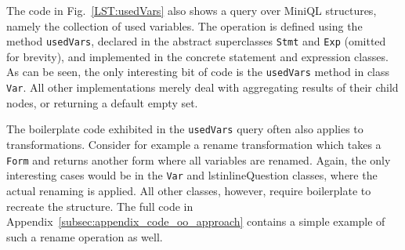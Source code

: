
The code in Fig.~\ref{LST:usedVars} also shows a query over MiniQL structures, namely the collection of used variables.
The operation is defined using the method \lstinline{usedVars}, declared in the abstract superclasses  \lstinline{Stmt} and \lstinline{Exp} (omitted for brevity), and implemented in the concrete statement and expression classes.
As can be seen, the only interesting bit of code is the \lstinline{usedVars} method in class \lstinline{Var}.
All other implementations merely deal with aggregating results of their child nodes, or returning a default empty set.

The boilerplate code exhibited in the \lstinline{usedVars} query often
also applies to transformations.  Consider for example a rename
transformation which takes a \lstinline{Form} and returns another form
where all variables are renamed.  Again, the only interesting cases would be 
in the \lstinline{Var} and lstinline{Question} classes, where the actual renaming is
applied. All other classes, however, require boilerplate to recreate
the structure. The full code in
Appendix~\ref{subsec:appendix_code_oo_approach} contains a simple
example of such a rename operation as well.


\begin{figure*}[t]
  \nocaptionrule
  \begin{minipage}[t]{0.48\textwidth}
  \end{minipage}
  \vline
  \hspace*{2pt}
  \begin{minipage}[t]{0.48\textwidth}
  \end{minipage}

    \caption{Implementing the ``used variables'' operation using traditional ASTs (left) and Object Algebras (right)}\label{LST:usedVars}
\end{figure*}


